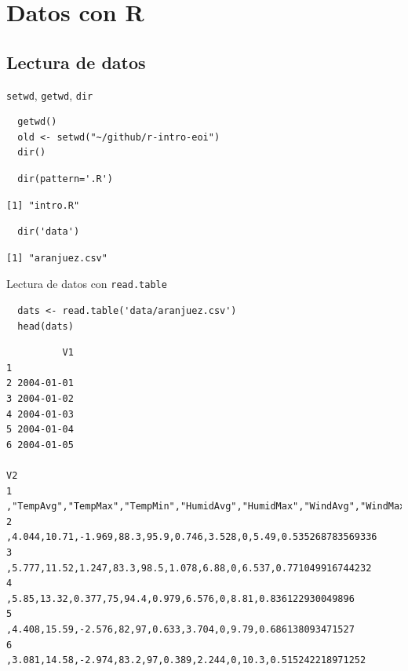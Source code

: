 \documentclass[xcolor={usenames,svgnames,dvipsnames}]{beamer}
\begin{document}
\section{Datos con R}
\label{sec-5}
\subsection{Lectura de datos}
\label{sec-5-1}
\begin{frame}[fragile,label=sec-5-1-1]{\texttt{setwd}, \texttt{getwd}, \texttt{dir}}
 \lstset{language=R,label= ,caption= ,numbers=none}
\begin{lstlisting}
  getwd()
  old <- setwd("~/github/r-intro-eoi")
  dir()
\end{lstlisting}

\lstset{language=R,label= ,caption= ,numbers=none}
\begin{lstlisting}
  dir(pattern='.R')
\end{lstlisting}

\begin{verbatim}
[1] "intro.R"
\end{verbatim}

\lstset{language=R,label= ,caption= ,numbers=none}
\begin{lstlisting}
  dir('data')
\end{lstlisting}

\begin{verbatim}
[1] "aranjuez.csv"
\end{verbatim}
\end{frame}

\begin{frame}[fragile,label=sec-5-1-2]{Lectura de datos con \texttt{read.table}}
 \lstset{language=R,label= ,caption= ,numbers=none}
\begin{lstlisting}
  dats <- read.table('data/aranjuez.csv')
  head(dats)
\end{lstlisting}

\begin{verbatim}
          V1
1           
2 2004-01-01
3 2004-01-02
4 2004-01-03
5 2004-01-04
6 2004-01-05
                                                                                                V2
1 ,"TempAvg","TempMax","TempMin","HumidAvg","HumidMax","WindAvg","WindMax","Rain","Radiation","ET"
2                               ,4.044,10.71,-1.969,88.3,95.9,0.746,3.528,0,5.49,0.535268783569336
3                                ,5.777,11.52,1.247,83.3,98.5,1.078,6.88,0,6.537,0.771049916744232
4                                   ,5.85,13.32,0.377,75,94.4,0.979,6.576,0,8.81,0.836122930049896
5                                   ,4.408,15.59,-2.576,82,97,0.633,3.704,0,9.79,0.686138093471527
6                                 ,3.081,14.58,-2.974,83.2,97,0.389,2.244,0,10.3,0.515242218971252
\end{verbatim}
\end{frame}
\end{document}
